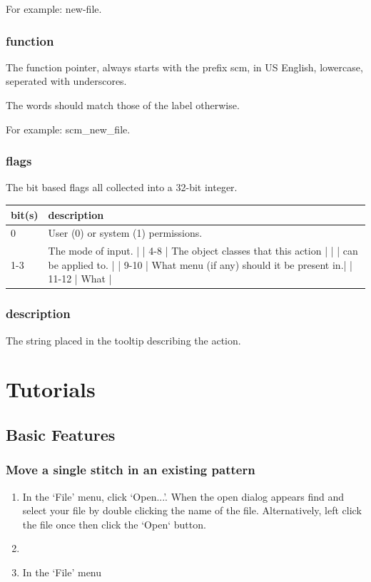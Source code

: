 \documentclass{report}
\begin{document}
For example: new-file.

\subsection{function}

The function pointer, always starts with the prefix scm,
in US English, lowercase, seperated with underscores.

The words should match those of the label otherwise.

For example: scm\_new\_file.

\subsection{flags}

The bit based flags all collected into a 32-bit integer.

\begin{longtable}{l l}
bit(s) & description \\
\hline
0 & User (0) or system (1) permissions. \\
1-3 & The mode of input.                         |
| 4-8    | The object classes that this action        |
|        | can be applied to.                         |
| 9-10   | What menu (if any) should it be present in.|
| 11-12  | What                                       |
\end{longtable}

\subsection{description}

The string placed in the tooltip describing the action.


\chapter{Tutorials}

\section{Basic Features}

\subsection{Move a single stitch in an existing pattern}

\begin{enumerate}
\item In the `File' menu, click `Open...'. When the open dialog appears find
  and select your file by double clicking the name of the file. Alternatively,
  left click the file once then click the `Open` button.
\item
\item In the `File' menu
\end{enumerate}
\end{document}
